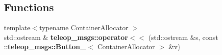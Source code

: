 \subsection*{Functions}
\begin{DoxyCompactItemize}
\item 
{\footnotesize template$<$typename ContainerAllocator $>$ }\\std::ostream \& {\bf teleop\_\-msgs::operator$<$$<$} (std::ostream \&s, const ::{\bf teleop\_\-msgs::Button\_\-}$<$ ContainerAllocator $>$ \&v)
\end{DoxyCompactItemize}
